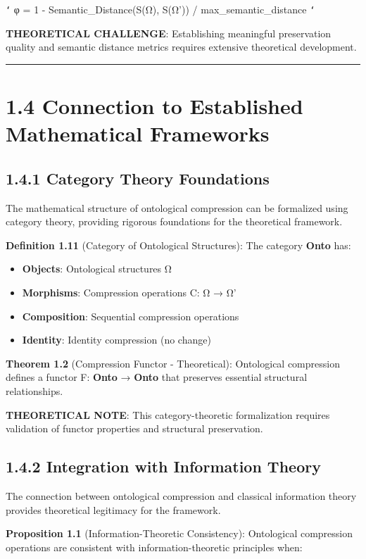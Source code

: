 \texttt{`}
φ = 1 - Semantic_Distance(S(Ω), S(Ω')) / max_semantic_distance
\texttt{`}

\textbf{THEORETICAL CHALLENGE}: Establishing meaningful preservation quality and semantic distance metrics requires extensive theoretical development.

\hrule

\section{1.4 Connection to Established Mathematical Frameworks}

\subsection{1.4.1 Category Theory Foundations}

The mathematical structure of ontological compression can be formalized using category theory, providing rigorous foundations for the theoretical framework.

\textbf{Definition 1.11} (Category of Ontological Structures): The category \textbf{Onto} has:
\begin{itemize}
\item \textbf{Objects}: Ontological structures Ω
\item \textbf{Morphisms}: Compression operations C: Ω → Ω'
\item \textbf{Composition}: Sequential compression operations
\item \textbf{Identity}: Identity compression (no change)
\end{itemize}

\textbf{Theorem 1.2} (Compression Functor - Theoretical): Ontological compression defines a functor F: \textbf{Onto} → \textbf{Onto} that preserves essential structural relationships.

\textbf{THEORETICAL NOTE}: This category-theoretic formalization requires validation of functor properties and structural preservation.

\subsection{1.4.2 Integration with Information Theory}

The connection between ontological compression and classical information theory provides theoretical legitimacy for the framework.

\textbf{Proposition 1.1} (Information-Theoretic Consistency): Ontological compression operations are consistent with information-theoretic principles when:

